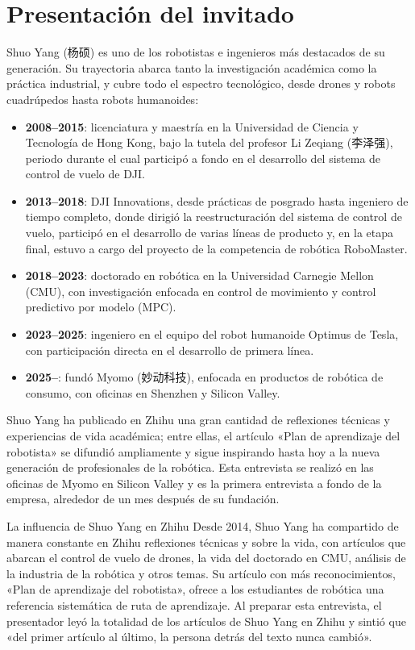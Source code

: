 \section{Presentación del invitado}

Shuo Yang (杨硕) es uno de los robotistas e ingenieros más destacados de su generación. Su trayectoria abarca tanto la investigación académica como la práctica industrial, y cubre todo el espectro tecnológico, desde drones y robots cuadrúpedos hasta robots humanoides:

\begin{itemize}
    \item \textbf{2008--2015}: licenciatura y maestría en la Universidad de Ciencia y Tecnología de Hong Kong, bajo la tutela del profesor Li Zeqiang (李泽强), periodo durante el cual participó a fondo en el desarrollo del sistema de control de vuelo de DJI.
    \item \textbf{2013--2018}: DJI Innovations, desde prácticas de posgrado hasta ingeniero de tiempo completo, donde dirigió la reestructuración del sistema de control de vuelo, participó en el desarrollo de varias líneas de producto y, en la etapa final, estuvo a cargo del proyecto de la competencia de robótica RoboMaster.
    \item \textbf{2018--2023}: doctorado en robótica en la Universidad Carnegie Mellon (CMU), con investigación enfocada en control de movimiento y control predictivo por modelo (MPC).
    \item \textbf{2023--2025}: ingeniero en el equipo del robot humanoide Optimus de Tesla, con participación directa en el desarrollo de primera línea.
    \item \textbf{2025--}: fundó Myomo (妙动科技), enfocada en productos de robótica de consumo, con oficinas en Shenzhen y Silicon Valley.
\end{itemize}

Shuo Yang ha publicado en Zhihu una gran cantidad de reflexiones técnicas y experiencias de vida académica; entre ellas, el artículo «Plan de aprendizaje del robotista» se difundió ampliamente y sigue inspirando hasta hoy a la nueva generación de profesionales de la robótica. Esta entrevista se realizó en las oficinas de Myomo en Silicon Valley y es la primera entrevista a fondo de la empresa, alrededor de un mes después de su fundación.

\begin{knowledgebox}{La influencia de Shuo Yang en Zhihu}
Desde 2014, Shuo Yang ha compartido de manera constante en Zhihu reflexiones técnicas y sobre la vida, con artículos que abarcan el control de vuelo de drones, la vida del doctorado en CMU, análisis de la industria de la robótica y otros temas. Su artículo con más reconocimientos, «Plan de aprendizaje del robotista», ofrece a los estudiantes de robótica una referencia sistemática de ruta de aprendizaje. Al preparar esta entrevista, el presentador leyó la totalidad de los artículos de Shuo Yang en Zhihu y sintió que «del primer artículo al último, la persona detrás del texto nunca cambió».
\end{knowledgebox}
